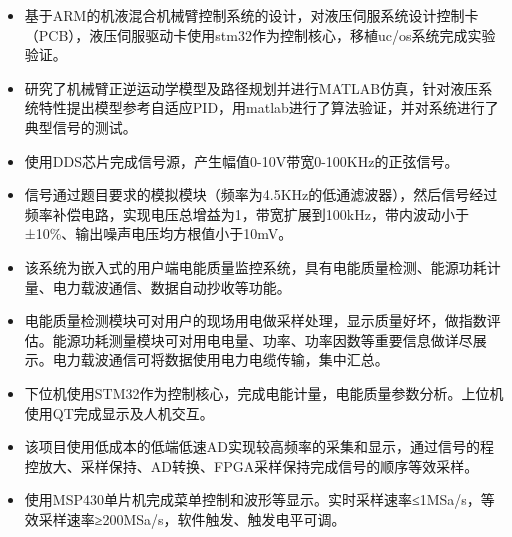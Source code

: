 \documentclass{resume}
\begin{document}
\begin{itemize}\small
  \item 基于ARM的机液混合机械臂控制系统的设计，对液压伺服系统设计控制卡（PCB），液压伺服驱动卡使用stm32作为控制核心，移植uc/os系统完成实验验证。
  \item 研究了机械臂正逆运动学模型及路径规划并进行MATLAB仿真，针对液压系统特性提出模型参考自适应PID，用matlab进行了算法验证，并对系统进行了典型信号的测试。
\end{itemize}
\begin{itemize}\small
  \item 使用DDS芯片完成信号源，产生幅值0-10V带宽0-100KHz的正弦信号。
  \item 信号通过题目要求的模拟模块（频率为4.5KHz的低通滤波器），然后信号经过频率补偿电路，实现电压总增益为1，带宽扩展到100kHz，带内波动小于±10\%、输出噪声电压均方根值小于10mV。
\end{itemize}
\begin{itemize}\small
  \item 该系统为嵌入式的用户端电能质量监控系统，具有电能质量检测、能源功耗计量、电力载波通信、数据自动抄收等功能。
  \item 电能质量检测模块可对用户的现场用电做采样处理，显示质量好坏，做指数评估。能源功耗测量模块可对用电电量、功率、功率因数等重要信息做详尽展示。电力载波通信可将数据使用电力电缆传输，集中汇总。
  \item 下位机使用STM32作为控制核心，完成电能计量，电能质量参数分析。上位机使用QT完成显示及人机交互。
\end{itemize}

\begin{itemize}\small
  \item 该项目使用低成本的低端低速AD实现较高频率的采集和显示，通过信号的程控放大、采样保持、AD转换、FPGA采样保持完成信号的顺序等效采样。
  \item 使用MSP430单片机完成菜单控制和波形等显示。实时采样速率≤1MSa/s，等效采样速率≥200MSa/s，软件触发、触发电平可调。
\end{itemize}
\end{document}
